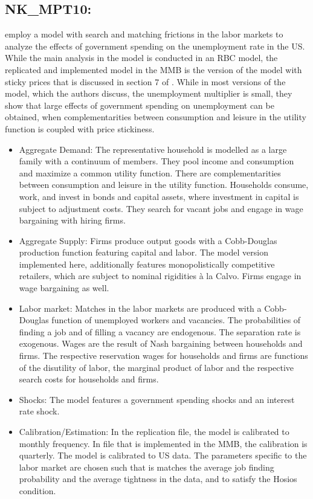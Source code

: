 \documentclass[11pt,a4paper]{article}
\begin{document}
	\subsection{NK\_MPT10: \texorpdfstring{\cite{monacelli2010unemployment}}{Monacelli et al. (2010)}}
	\label{NKMPT10}
	\cite{monacelli2010unemployment} employ a model with search and matching frictions in the labor markets to analyze the effects of government spending on the unemployment rate in the US. While the main analysis in the model is conducted in an RBC model, the replicated and implemented model in the MMB is the version of the model with sticky prices that is discussed in section 7 of \cite{monacelli2010unemployment}. While in most versions of the model, which the authors discuss, the unemployment multiplier is small, they show that large effects of government spending on unemployment can be obtained, when complementarities between consumption and leisure in the utility function is coupled with price stickiness. 
	\begin{itemize}
		\item Aggregate Demand: The representative household is modelled as a large family with a continuum of members. They pool income and consumption and maximize a common utility function. There are complementarities between consumption and leisure in the utility function. Households consume, work, and invest in bonds and capital assets, where investment in capital is subject to adjustment costs. They search for vacant jobs and engage in wage bargaining with hiring firms.
		
		\item Aggregate Supply: Firms produce output goods with a Cobb-Douglas production function featuring capital and labor. The model version implemented here, additionally features monopolistically competitive retailers, which are subject to nominal rigidities \`{a} la Calvo. Firms engage in wage bargaining as well. 
		
		\item Labor market: Matches in the labor markets are produced with a Cobb-Douglas function of unemployed workers and vacancies. The probabilities of finding a job and of filling a vacancy are endogenous. The separation rate is exogenous. Wages are the result of Nash bargaining between households and firms. The respective reservation wages for households and firms are functions of the disutility of labor, the marginal product of labor and the respective search costs for households and firms.
		
		\item Shocks: The model features a government spending shocks and an interest rate shock.
		
		\item Calibration/Estimation: In the replication file, the model is calibrated to monthly frequency. In file that is implemented in the MMB, the calibration is quarterly. The model is calibrated to US data. The parameters specific to the labor market are chosen such that is matches the average job finding probability and the average tightness in the data, and to satisfy the Hosios condition. 
	\end{itemize}
	
\end{document}

